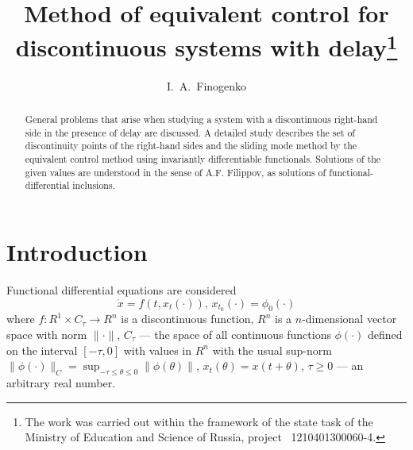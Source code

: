 \documentclass[12pt]{llncs}
\begin{document}
\fi
%
\title{Method of equivalent control for discontinuous systems with delay\thanks{The work was carried out within the framework of the state task of the Ministry of Education and Science of Russia, project \textnumero~1210401300060-4.}}
\author{I.~A.~Finogenko }



\maketitle

\begin{abstract}
	General problems that arise when studying a system with a discontinuous right-hand side in the presence of delay are discussed. A detailed study describes the set of discontinuity points of the right-hand sides and the sliding mode method by the equivalent control method using invariantly differentiable functionals. Solutions of the given values are understood in the sense of A.F. Filippov, as solutions of functional-differential inclusions.

\end{abstract}

\section{Introduction}
Functional differential equations are considered
\begin{equation}\label{Finogenko-eq1}
	\dot{x}=f(t,x_{t}(\cdot)), \,x_{t_{0}}(\cdot)=\phi_{0}(\cdot)
\end{equation}
where $f:R^{1}\times C_{\tau}\rightarrow R^{n}$ is a discontinuous function, $R^{n}$ is a $n$-dimensional vector space with norm $ \|\cdot\|$, $C_\tau$ --- the space of all continuous functions $\phi(\cdot)$ defined on the interval $[-\tau, 0]$ with
values in $R^n$ with the usual sup-norm
${\|\phi(\cdot)\|_C = \sup_{-\tau \leq \theta \leq 0} \| \phi(\theta) \|}$, $x_{t}(\theta)=x(t+\theta)$, $\tau \geq 0$ --- an arbitrary real number.
\end{document}
